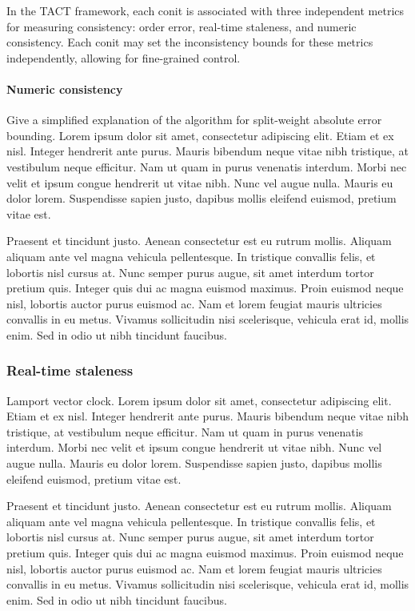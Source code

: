 In the TACT framework, each conit is associated with three independent
metrics for measuring consistency: order error, real-time staleness,
and numeric consistency. Each conit may set the inconsistency bounds
for these metrics independently, allowing for fine-grained control.

\paragraph{Numeric consistency}

Give a simplified explanation of the algorithm for split-weight
absolute error bounding. Lorem ipsum dolor sit amet, consectetur
adipiscing elit. Etiam et ex nisl. Integer hendrerit ante
purus. Mauris bibendum neque vitae nibh tristique, at vestibulum neque
efficitur. Nam ut quam in purus venenatis interdum. Morbi nec velit et
ipsum congue hendrerit ut vitae nibh. Nunc vel augue nulla. Mauris eu
dolor lorem. Suspendisse sapien justo, dapibus mollis eleifend
euismod, pretium vitae est.

Praesent et tincidunt justo. Aenean consectetur est eu rutrum
mollis. Aliquam aliquam ante vel magna vehicula pellentesque. In
tristique convallis felis, et lobortis nisl cursus at. Nunc semper
purus augue, sit amet interdum tortor pretium quis. Integer quis dui
ac magna euismod maximus. Proin euismod neque nisl, lobortis auctor
purus euismod ac. Nam et lorem feugiat mauris ultricies convallis in
eu metus. Vivamus sollicitudin nisi scelerisque, vehicula erat id,
mollis enim. Sed in odio ut nibh tincidunt faucibus.

\subsubsection*{Real-time staleness}

Lamport vector clock. Lorem ipsum dolor sit amet, consectetur
adipiscing elit. Etiam et ex nisl. Integer hendrerit ante
purus. Mauris bibendum neque vitae nibh tristique, at vestibulum neque
efficitur. Nam ut quam in purus venenatis interdum. Morbi nec velit et
ipsum congue hendrerit ut vitae nibh. Nunc vel augue nulla. Mauris eu
dolor lorem. Suspendisse sapien justo, dapibus mollis eleifend
euismod, pretium vitae est.

Praesent et tincidunt justo. Aenean consectetur est eu rutrum
mollis. Aliquam aliquam ante vel magna vehicula pellentesque. In
tristique convallis felis, et lobortis nisl cursus at. Nunc semper
purus augue, sit amet interdum tortor pretium quis. Integer quis dui
ac magna euismod maximus. Proin euismod neque nisl, lobortis auctor
purus euismod ac. Nam et lorem feugiat mauris ultricies convallis in
eu metus. Vivamus sollicitudin nisi scelerisque, vehicula erat id,
mollis enim. Sed in odio ut nibh tincidunt faucibus.

